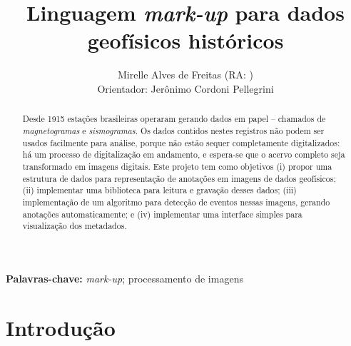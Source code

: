\documentclass{article}
\title{Linguagem {\em mark-up} para dados geofísicos históricos}
\author{Mirelle Alves de Freitas (RA: )\\
  Orientador: Jerônimo Cordoni Pellegrini}
\begin{document}
\maketitle

\begin{abstract}
  Desde 1915 estações brasileiras operaram gerando dados
  em papel -- chamados de {\em magnetogramas} e {\em sismogramas}. Os
  dados contidos nestes registros não podem ser usados facilmente para
  análise, porque não estão sequer completamente digitalizados: há um
  processo de 
  digitalização em andamento, e espera-se que o acervo completo seja
  transformado em imagens digitais.
  Este projeto tem como objetivos (i) propor uma estrutura de dados para
  representação de anotações em imagens de dados geofísicos; (ii)
  implementar uma biblioteca para leitura e gravação desses dados;
  (iii) implementação de um algoritmo para detecção de eventos nessas
  imagens, gerando anotações automaticamente; e (iv)  implementar uma
  interface simples para visualização dos metadados.
\end{abstract}


\begin{center}
  \begin{minipage}{10cm}
    \begin{center}
      \textbf{Palavras-chave:} {\em mark-up}; processamento de imagens
    \end{center}
  \end{minipage}
\end{center}

\section{Introdução}
\end{document}
